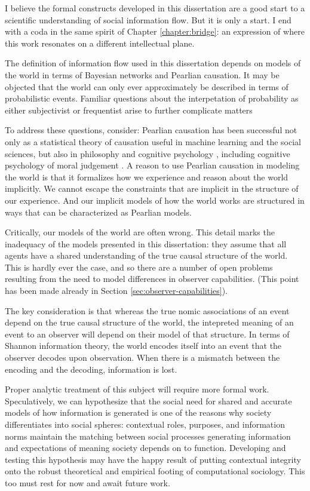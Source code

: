 \documentclass[../thesis.tex]{subfiles}
\begin{document}
 I believe the formal constructs developed in this
 dissertation are a good start to a scientific understanding
 of social information flow.
 But it is only a start.
 I end with a coda in the same spirit of
 Chapter \ref{chapter:bridge}:
 an expression of where this work resonates on a different
 intellectual plane.

 The definition of information flow used in this dissertation depends on models of the world in terms of Bayesian networks and
 Pearlian causation.
 It may be objected that the world can only ever approximately be
 described in terms of probabilistic events.
 Familiar questions about the interpetation of probability
 as either subjectivist or frequentist arise to further complicate
 matters

 To address these questions, consider:
 Pearlian causation has been successful not only as a statistical
 theory of causation useful in machine learning and the social
 sciences, but also in philosophy \citep{woodward2005making} and
 cognitive psychology \citep{sloman2005causal}, including
 cognitive psychology of moral judgement \citep{sloman2009causal}.
 A reason to use Pearlian causation
 in modeling the world is that it formalizes
 how we experience and reason about the world implicitly.
 We cannot escape the constraints that are implicit in the
 structure of our experience.
 And our implicit models of how the world works
 are structured in ways that can be characterized as Pearlian models.

 Critically, our models of the world are often wrong.
 This detail marks the inadequacy of the models presented
 in this dissertation: they assume that all agents have
 a shared understanding of the true causal structure of
 the world.
 This is hardly ever the case, and so there are a number of
 open problems resulting from the need to model
 differences in observer capabilities. (This point
 has been made already in Section \ref{sec:observer-capabilities}).

 The key consideration is that whereas the true nomic associations
 of an event depend on the true causal structure of the world,
 the intepreted meaning of an event to an observer will depend
 on their model of that structure.
 In terms of Shannon information theory, the world encodes
 itself into an event that the observer decodes upon observation.
 When there is a mismatch between the encoding and the decoding,
 information is lost.

 Proper analytic treatment of this subject will require more
 formal work.
 Speculatively, we can hypothesize that the social need for
 shared and accurate models of how information is generated
 is one of the reasons why society differentiates into
 social spheres:
 contextual roles, purposes, and information norms maintain
 the matching between social processes generating information
 and expectations of meaning society depends on to function.
 Developing and testing this hypothesis may have the happy
 result of putting contextual integrity onto the robust
 theoretical and empirical footing of computational sociology.
 This too must rest for now and await future work.
\end{document}
